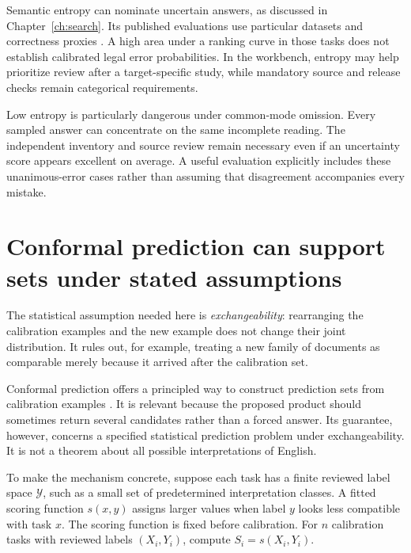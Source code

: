 Semantic entropy can nominate uncertain answers, as discussed in
Chapter~\ref{ch:search}. Its published evaluations use particular datasets and
correctness proxies \citep{semantic2023}. A high area under a ranking curve in
those tasks does not establish calibrated legal error probabilities. In the
workbench, entropy may help prioritize review after a target-specific study, while
mandatory source and release checks remain categorical requirements.

Low entropy is particularly dangerous under common-mode omission. Every sampled
answer can concentrate on the same incomplete reading. The independent inventory
and source review remain necessary even if an uncertainty score appears excellent
on average. A useful evaluation explicitly includes these unanimous-error cases
rather than assuming that disagreement accompanies every mistake.

\section{Conformal prediction can support sets under stated assumptions}
\label{merge:M09:09}

The statistical assumption needed here is \emph{exchangeability}: rearranging
the calibration examples and the new example does not change their joint
distribution. It rules out, for example, treating a new family of documents
as comparable merely because it arrived after the calibration set.

Conformal prediction offers a principled way to construct prediction sets from
calibration examples \citep[section 1.1 and appendix D]{conformal2022}. It is
relevant because the proposed product should sometimes return several candidates
rather than a forced answer. Its guarantee, however, concerns a specified
statistical prediction problem under exchangeability. It is not a theorem about
all possible interpretations of English.

To make the mechanism concrete, suppose each task has a finite reviewed label
space $\mathcal Y$, such as a small set of predetermined interpretation classes.
A fitted scoring function $s(x,y)$ assigns larger values when label $y$ looks less
compatible with task $x$. The scoring function is fixed before calibration.
For $n$ calibration tasks with reviewed labels $(X_i,Y_i)$, compute
$S_i=s(X_i,Y_i)$.

